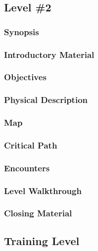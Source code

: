 \subsection{Level \#2}

\subsubsection{Synopsis}

\subsubsection{Introductory Material}

\subsubsection{Objectives}

\subsubsection{Physical Description}

\subsubsection{Map}

\subsubsection{Critical Path}

\subsubsection{Encounters}

\subsubsection{Level Walkthrough}

\subsubsection{Closing Material}

\subsection{Training Level}

\newpage